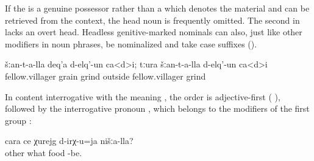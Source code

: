 If the  is a genuine possessor rather than a  which denotes the material and can be retrieved from the context, the head noun is frequently omitted. The second  in  lacks an overt head. Headless genitive-marked nominals can also, just like other modifiers in noun phrases, be nominalized and take case suffixes ().

\begin{exe}
	\ex	\label{ex:‎‎The villagers have milled their wheat; the people from other villages have milled (it)}
	\gll	šːan-t-a-lla	deq'a	d-elq'-un	ca<d>i;	tːura	šːan-t-a-lla	d-elq'-un	ca<d>i\\
		fellow.villager	grain	grind		outside	fellow.villager	grind	\\
	\glt	{}
\end{exe}

In content interrogative  with the meaning , the order is adjective-first ( ), followed by the interrogative pronoun  , which belongs to the modifiers of the first group :

\begin{exe}
	\ex	\label{ex:What other food of ours exists@12}
	\gll	cara	ce	χurejg	d-irχ-u=ja	nišːa-lla?\\
		other	what	food	-be.	\\
	\glt	{}
\end{exe}



